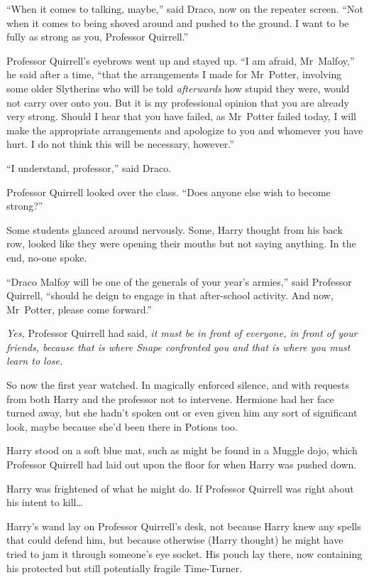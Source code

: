 “When it comes to talking, maybe,” said Draco, now on the repeater screen. “Not when it comes to being shoved around and pushed to the ground. I want to be fully as strong as you, Professor Quirrell.”

Professor Quirrell’s eyebrows went up and stayed up. “I am afraid, Mr~Malfoy,” he said after a time, “that the arrangements I made for Mr~Potter, involving some older Slytherins who will be told \emph{afterwards} how stupid they were, would not carry over onto you. But it is my professional opinion that you are already very strong. Should I hear that you have failed, as Mr~Potter failed today, I will make the appropriate arrangements and apologize to you and whomever you have hurt. I do not think this will be necessary, however.”

“I understand, professor,” said Draco.

Professor Quirrell looked over the class. “Does anyone else wish to become strong?”

Some students glanced around nervously. Some, Harry thought from his back row, looked like they were opening their mouths but not saying anything. In the end, no-one spoke.

“Draco Malfoy will be one of the generals of your year’s armies,” said Professor Quirrell, “should he deign to engage in that after-school activity. And now, Mr~Potter, please come forward.”

\later

\emph{Yes,} Professor Quirrell had said, \emph{it must be in front of everyone, in front of your friends, because that is where Snape confronted you and that is where you must learn to lose.}

So now the first year watched. In magically enforced silence, and with requests from both Harry and the professor not to intervene. Hermione had her face turned away, but she hadn’t spoken out or even given him any sort of significant look, maybe because she’d been there in Potions too.

Harry stood on a soft blue mat, such as might be found in a Muggle dojo, which Professor Quirrell had laid out upon the floor for when Harry was pushed down.

Harry was frightened of what he might do. If Professor Quirrell was right about his intent to kill…

Harry’s wand lay on Professor Quirrell’s desk, not because Harry knew any spells that could defend him, but because otherwise (Harry thought) he might have tried to jam it through someone’s eye socket. His pouch lay there, now containing his protected but still potentially fragile Time-Turner.

